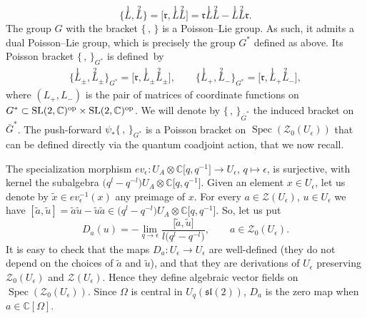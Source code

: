 \documentclass[pdftex]{sigma}%
\numberwithin{equation}{section}
\numberwithin{figure}{section}
\newcommand{\Ue}{U_\epsilon}
\newcommand{\e}{\epsilon}
\newcommand{\mc}{\mathbb{C}}
\newcommand{\ra}{\rightarrow}
\begin{document}
\begin{equation*}%
\big\{\!\stackrel{1}{L},\stackrel{2}{L}\!\big\} = \big[\mathfrak{r},\stackrel{1}{L}\stackrel{2}{L}\!\big] = \mathfrak{r}\stackrel{1}{L}\stackrel{2}{L} - \stackrel{1}{L}\stackrel{2}{L}\mathfrak{r}.
\end{equation*}
The group $G$ with the bracket $\{\, ,\, \}$ is a Poisson--Lie group. As such, it admits a dual Poisson--Lie group, which is precisely the group $G^*$ defined as above. Its Poisson bracket $\{\,,\, \}_{G^*}$ is defi\-ned~by
\begin{gather}\label{bracketdual}
\big\{\!\stackrel{1}{L}_\pm,\stackrel{2}{L}_\pm \big\}_{G^*} = \big[\mathfrak{r},\stackrel{1}{L}_\pm\stackrel{2}{L}_\pm\!\big],\qquad
\big\{\!\stackrel{1}{L}_+,\stackrel{2}{L}_- \big\}_{G^*} = \big[\mathfrak{r},\stackrel{1}{L}_+\stackrel{2}{L}_-\!\big],
\end{gather}
where $(L_+,L_-)$ is the pair of matrices of coordinate functions on $G^*\subset {\rm SL}(2,\mc)^{\rm op}\times {\rm SL}(2,\mc)^{\rm op}$. We will denote by $\{\,,\,\}_{\bar G^*}$ the induced bracket on $\bar G^*$. The push-forward $\psi_*\{\, ,\, \}_{G^*}$ is a Poisson bracket on $\operatorname{Spec}(\mathcal{Z}_0(U_\epsilon))$ that can be defined directly via the quantum coadjoint action, that we now recall.

The specialization morphism $ev_\epsilon\colon U_A \otimes \mc\big[q,q^{-1}\big]\ra U_\e$, $q\mapsto \epsilon$, is surjective, with kernel the subalgebra $\big(q^l-q^{-l}\big)U_A\otimes \mc\big[q,q^{-1}\big]$. Given an element $x\in U_\e$, let us denote by $\tilde x \in ev_\epsilon^{-1}(x)$ any preimage of $x$. For every $a\in \mathcal{Z}(U_\epsilon)$, $u \in U_\e$ we have $[\tilde{a},\tilde u] = \tilde{a}\tilde u - \tilde{u}\tilde a\in \big(q^l-q^{-l}\big)U_A\otimes \mc\big[q,q^{-1}\big]$. So, let us put
\begin{equation}\label{defder}
D_a(u) = - \lim_{q\rightarrow \e}\frac{\big[\tilde{a},\tilde u\big]}{l\big(q^l-q^{-l}\big)},\qquad
a\in \mathcal{Z}_0(U_\epsilon).
\end{equation}
It is easy to check that the maps $D_a\colon \Ue \ra \Ue$ are well-defined (they do not depend on the choices of $\tilde a$ and $\tilde u$), and that they are derivations of $U_\e$ preserving $\mathcal{Z}_0(U_\epsilon)$ and $\mathcal{Z}(U_\epsilon)$. Hence they define algebraic vector fields on $\operatorname{Spec}(\mathcal{Z}_0(U_\epsilon))$. Since $\Omega$ is central in $U_q({\mathfrak{sl}}(2))$, $D_a$ is the zero map when $a\in \mc[\Omega]$.
\end{document}
